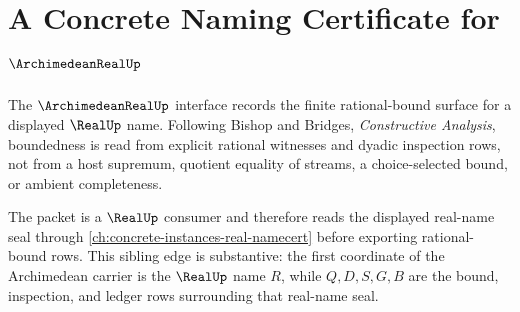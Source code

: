\chapter{A Concrete Naming Certificate for $\ArchimedeanRealUp$}
\label{ch:concrete-instances-archimedeanreal-namecert}

The $\ArchimedeanRealUp$ interface records the finite rational-bound surface for a displayed $\RealUp$ name. Following Bishop and Bridges, \emph{Constructive Analysis}, boundedness is read from explicit rational witnesses and dyadic inspection rows, not from a host supremum, quotient equality of streams, a choice-selected bound, or ambient completeness.

The packet is a $\RealUp$ consumer and therefore reads the displayed real-name seal through \autoref{ch:concrete-instances-real-namecert} before exporting rational-bound rows. This sibling edge is substantive: the first coordinate of the Archimedean carrier is the $\RealUp$ name $R$, while $Q,D,S,G,B$ are the bound, inspection, and ledger rows surrounding that real-name seal.

